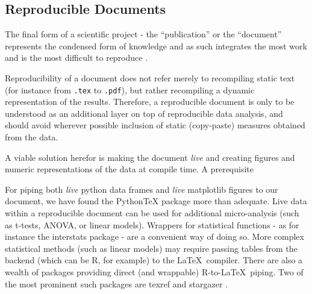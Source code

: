 	\subsection{Reproducible Documents}\label{sec:b_rd}
	    The final form of a scientific project - the “publication” or the “document” represents the condensed form of knowledge and as such integrates the most work and is the most difficult to reproduce \cite{Schwab2000}.
	    
	    Reproducibility of a document does not refer merely to recompiling static text (for instance from \colorbox{vlg}{\texttt{.tex}} to \colorbox{vlg}{\texttt{.pdf}}), but rather recompiling a dynamic representation of the results.
	    Therefore, a reproducible document is only to be understood as an additional layer on top of reproducible data analysis, and should avoid wherever possible inclusion of static (copy-paste) measures obtained from the data. 
	    
	    A viable solution herefor is making the document \textit{live} and creating figures and numeric representations of the data at compile time.
	    A prerequisite 
	    
	    
	    For piping both \textit{live} python data frames and \textit{live} matplotlib figures to our document, we have found the PythonTeX \cite{Poore2013} package more than adequate.
	    Live data within a reproducible document can be used for additional micro-analysis (such as t-tests, ANOVA, or linear models).
	    Wrappers for statistical functions - as for instance the interstats package \cite{interstats} - are a convenient way of doing so.
	    More complex statistical methods (such as linear models) may require passing tables from the backend (which can be R\cite{R}, for example) to the \LaTeX\ compiler.
	    There are also a wealth of packages providing direct (and wrappable) R-to-\LaTeX\ piping.
	    Two of the most prominent such packages are texref \cite{Leifeld2013} and stargazer \cite{Hlavac2013}.
\fi
